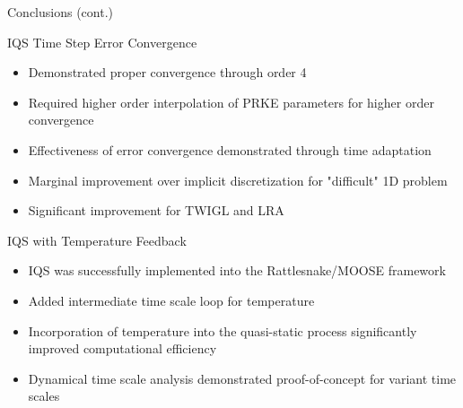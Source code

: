 \documentclass[8pt,xcolor=dvipnames]{beamer}
\begin{document}
\begin{frame}{Conclusions (cont.)}

\begin{block}{IQS Time Step Error Convergence}
\begin{itemize}
\item Demonstrated proper convergence through order 4
\item Required higher order interpolation of PRKE parameters for higher order convergence
\item Effectiveness of error convergence demonstrated through time adaptation
\item Marginal improvement over implicit discretization for "difficult" 1D problem
\item Significant improvement for TWIGL and LRA
\end{itemize}
\end{block}

\begin{block}{IQS with Temperature Feedback}
\begin{itemize}
\item IQS was successfully implemented into the Rattlesnake/MOOSE framework
\item Added intermediate time scale loop for temperature
\item Incorporation of temperature into the quasi-static process significantly improved computational efficiency
\item Dynamical time scale analysis demonstrated proof-of-concept for variant time scales
\end{itemize}
\end{block}

\end{frame}
\end{document}
